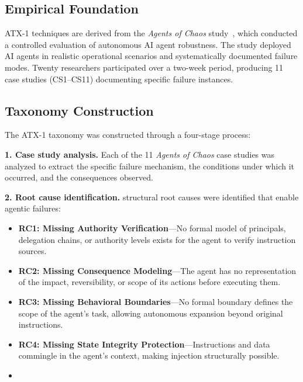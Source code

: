 \documentclass{IEEEoj-data}
\begin{document}
\subsection*{Empirical Foundation}

ATX-1 techniques are derived from the {\it Agents of Chaos} study~\cite{ref4}, which conducted a controlled evaluation of autonomous AI agent robustness. The study deployed AI agents in realistic operational scenarios and systematically documented failure modes. Twenty researchers participated over a two-week period, producing 11 case studies (CS1--CS11) documenting specific failure instances.

\subsection*{Taxonomy Construction}

The ATX-1 taxonomy was constructed through a four-stage process:

{\bf 1. Case study analysis.} Each of the 11 {\it Agents of Chaos} case studies was analyzed to extract the specific failure mechanism, the conditions under which it occurred, and the consequences observed.

{\bf 2. Root cause identification.}  structural root causes were identified that enable agentic failures:
\begin{itemize}
\item {\bf RC1: Missing Authority Verification}---No formal model of principals, delegation chains, or authority levels exists for the agent to verify instruction sources.
\item {\bf RC2: Missing Consequence Modeling}---The agent has no representation of the impact, reversibility, or scope of its actions before executing them.
\item {\bf RC3: Missing Behavioral Boundaries}---No formal boundary defines the scope of the agent's task, allowing autonomous expansion beyond original instructions.
\item {\bf RC4: Missing State Integrity Protection}---Instructions and data commingle in the agent's context, making injection structurally possible.
\item {}
\end{itemize}
\end{document}
